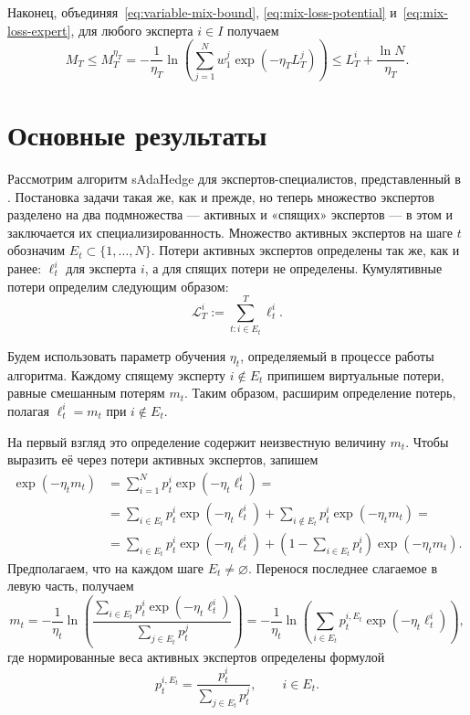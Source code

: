 \documentclass[a4paper,12pt]{article}
\renewcommand{\emptyset}{\varnothing}
\theoremstyle{plain}
\theoremstyle{definition}
\theoremstyle{remark}
\numberwithin{equation}{section}
\begin{document}
Наконец, объединяя~\eqref{eq:variable-mix-bound}, \eqref{eq:mix-loss-potential} и~\eqref{eq:mix-loss-expert}, для любого эксперта $i\in I$ получаем
\begin{equation}
\label{eq:variable-mix-expert}
M_T \leqslant M_T^{\eta_T}
= -\frac{1}{\eta_T}\ln\left(
    \sum_{j=1}^{N}w_1^j\exp\left(-\eta_T L_T^j\right)
  \right)
\leqslant L_T^i+\frac{\ln N}{\eta_T}.
\end{equation}

\section{Основные результаты}
\label{sec:results}
Рассмотрим алгоритм sAdaHedge для экспертов-специалистов, представленный в \cite{VyuginSham}.
Постановка задачи такая же, как и прежде, но теперь множество экспертов разделено на два подмножества — активных и «спящих» экспертов — в этом и заключается их специализированность.
Множество активных экспертов на шаге $t$ обозначим $E_t \subset \{1, \dots, N\}$.
Потери активных экспертов определены так же, как и ранее: $\ell_t^i$ для эксперта $i$, а для спящих потери не определены.
Кумулятивные потери определим следующим образом:
\[\mathcal{L}_T^i := \sum\limits_{t: i \in E_t}^{T} \ell_t^i.\]

Будем использовать параметр обучения $\eta_t$, определяемый в процессе работы алгоритма. Каждому спящему эксперту $i\notin E_t$ припишем виртуальные потери, равные смешанным потерям $m_t$. Таким образом, расширим определение потерь, полагая $\ell_t^i=m_t$ при $i\notin E_t$.

На первый взгляд это определение содержит неизвестную величину $m_t$. Чтобы выразить её через потери активных экспертов, запишем
\[
\begin{aligned}
\exp(-\eta_t m_t)
&= \sum_{i=1}^{N}p_t^i\exp(-\eta_t\ell_t^i) =\\
&= \sum_{i\in E_t}p_t^i\exp(-\eta_t\ell_t^i)
 + \sum_{i\notin E_t}p_t^i\exp(-\eta_t m_t) =\\
&= \sum_{i\in E_t}p_t^i\exp(-\eta_t\ell_t^i)
 + \left(1-\sum_{i\in E_t}p_t^i\right)\exp(-\eta_t m_t).
\end{aligned}
\]
Предполагаем, что на каждом шаге $E_t\ne\emptyset$. Перенося последнее слагаемое в левую часть, получаем
\begin{equation}
\label{eq:specialist-mix-loss}
m_t
= -\frac{1}{\eta_t}\ln\left(
 \frac{\sum_{i\in E_t}p_t^i\exp(-\eta_t\ell_t^i)}
      {\sum_{j\in E_t}p_t^j}\right)
= -\frac{1}{\eta_t}\ln\left(
 \sum_{i\in E_t}p_t^{i,E_t}\exp(-\eta_t\ell_t^i)\right),
\end{equation}
где нормированные веса активных экспертов определены формулой
\begin{equation}
\label{eq:specialist-weights}
p_t^{i,E_t}
= \frac{p_t^i}{\sum_{j\in E_t}p_t^j},
\qquad i\in E_t.
\end{equation}
\end{document}
